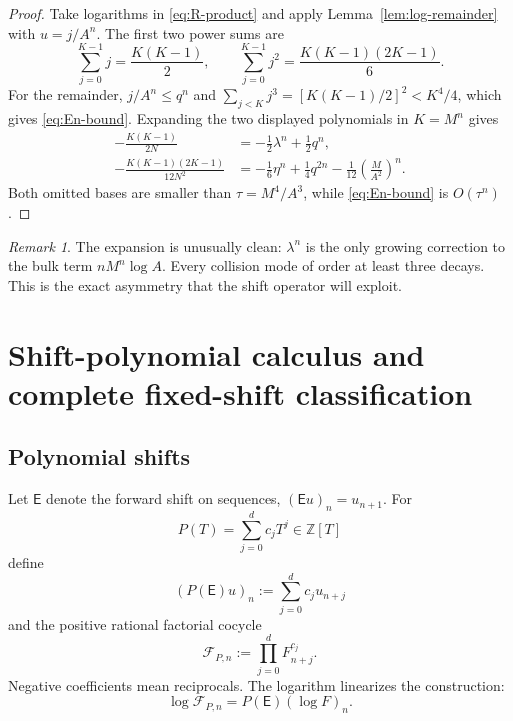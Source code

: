 \documentclass[11pt,oneside]{article}
\theoremstyle{definition}
\theoremstyle{remark}
\newtheorem{remark}[theorem]{Remark}
\newcommand{\Z}{\mathbb Z}
\newcommand{\EF}{\mathsf E}
\newcommand{\cF}{\mathcal F}
\begin{document}
\begin{proof}
Take logarithms in \eqref{eq:R-product} and apply Lemma~\ref{lem:log-remainder} with
$u=j/A^n$.  The first two power sums are
\[
 \sum_{j=0}^{K-1}j=\frac{K(K-1)}2,
 \qquad
 \sum_{j=0}^{K-1}j^2=\frac{K(K-1)(2K-1)}6.
\]
For the remainder, $j/A^n\le q^n$ and
$\sum_{j<K}j^3=[K(K-1)/2]^2<K^4/4$, which gives
\eqref{eq:En-bound}.  Expanding the two displayed polynomials in $K=M^n$ gives
\begin{align*}
 -\frac{K(K-1)}{2N}
 &=-\frac12\lambda^n+\frac12q^n,\\
 -\frac{K(K-1)(2K-1)}{12N^2}
 &=-\frac16\eta^n+\frac14q^{2n}
   -\frac1{12}\left(\frac{M}{A^2}\right)^n.
\end{align*}
Both omitted bases are smaller than $\tau=M^4/A^3$, while
\eqref{eq:En-bound} is $O(\tau^n)$.
\end{proof}

\begin{remark}
The expansion is unusually clean: $\lambda^n$ is the only growing correction to the bulk
term $nM^n\log A$.  Every collision mode of order at least three decays.  This is the exact
asymmetry that the shift operator will exploit.
\end{remark}

\section{Shift-polynomial calculus and complete fixed-shift classification}
\label{sec:shift}

\subsection{Polynomial shifts}

Let $\EF$ denote the forward shift on sequences,
$(\EF u)_n=u_{n+1}$.  For
\begin{equation}
 P(T)=\sum_{j=0}^{d}c_jT^j\in\Z[T]
 \label{eq:P-def}
\end{equation}
define
\begin{equation}
 (P(\EF)u)_n:=\sum_{j=0}^{d}c_ju_{n+j}
 \label{eq:shift-eval}
\end{equation}
and the positive rational factorial cocycle
\begin{equation}
 \cF_{P,n}:=\prod_{j=0}^{d}F_{n+j}^{c_j}.
 \label{eq:factorial-cocycle}
\end{equation}
Negative coefficients mean reciprocals.  The logarithm linearizes the construction:
\begin{equation}
 \log\cF_{P,n}=P(\EF)(\log F)_n.
 \label{eq:cocycle-log}
\end{equation}
\end{document}
